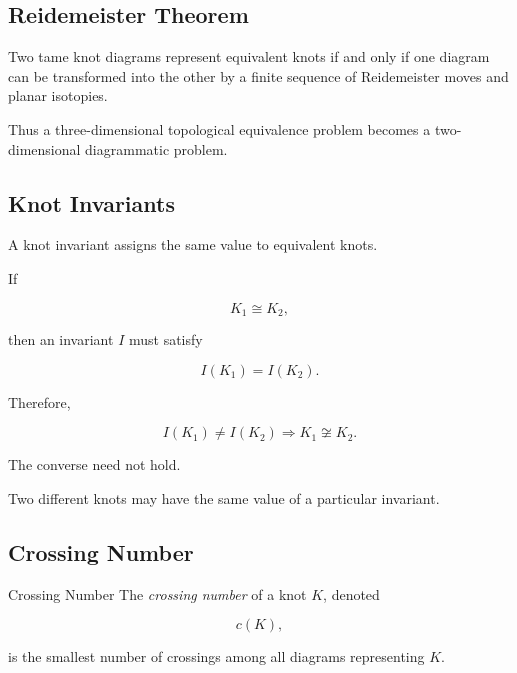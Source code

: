 \subsection{Reidemeister Theorem}
\label{subsec:reidemeister-theorem}

\begin{theorem}
Two tame knot diagrams represent equivalent knots if and only if one diagram
can be transformed into the other by a finite sequence of Reidemeister moves
and planar isotopies.
\end{theorem}

Thus a three-dimensional topological equivalence problem becomes a
two-dimensional diagrammatic problem.

\subsection{Knot Invariants}
\label{subsec:knot-invariants}

A knot invariant assigns the same value to equivalent knots.

If

\[
K_1\cong K_2,
\]

then an invariant \(I\) must satisfy

\[
\boxed{
I(K_1)=I(K_2).
}
\]

Therefore,

\[
\boxed{
I(K_1)\neq I(K_2)
\Longrightarrow
K_1\not\cong K_2.
}
\]

The converse need not hold.

Two different knots may have the same value of a particular invariant.

\subsection{Crossing Number}
\label{subsec:crossing-number}

\begin{definitionbox}{Crossing Number}
The \emph{crossing number} of a knot \(K\), denoted

\[
\boxed{
c(K),
}
\]

is the smallest number of crossings among all diagrams representing \(K\).
\end{definitionbox}

